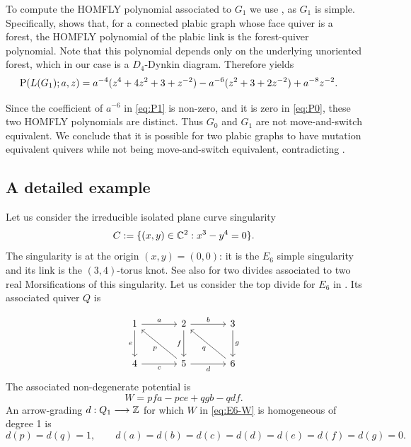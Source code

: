 \noindent To compute the HOMFLY polynomial associated to $G_1$ we use \cite{Schwartz}, as $G_1$ is simple. Specifically, \cite[Theorem~3.11]{Schwartz} shows that, for a connected plabic graph whose face quiver is a forest, the HOMFLY polynomial of the plabic link is the forest-quiver polynomial. Note that this polynomial depends only on the underlying unoriented forest, which in our case is a $D_4$-Dynkin diagram. Therefore \cite[Example~4.8]{Schwartz} yields
\begin{equation}\label{eq:P1}
\begin{aligned}
\operatorname{P}(L(G_1);a,z)
={}&a^{-4}(z^4+4z^2+3+z^{-2})-a^{-6}(z^2+3+2z^{-2})
+a^{-8}z^{-2}.
\end{aligned}
\end{equation}

\noindent Since the coefficient of $a^{-6}$ in \eqref{eq:P1} is non-zero, and it is zero in \eqref{eq:P0}, these two HOMFLY polynomials are distinct. Thus $G_0$ and $G_1$ are not move-and-switch equivalent. We conclude that it is possible for two plabic graphs to have mutation equivalent quivers while not being move-and-switch equivalent, contradicting \cite[Conjecture 6.17]{FPST}.

\subsection{A detailed example}\label{ssec:examples}

Let us consider the irreducible isolated plane curve singularity
\[
 C:=\{(x,y)\in\mathbb C^2:x^3-y^4=0\}.
\]
The singularity is at the origin $(x,y)=(0,0)$: it is the $E_6$ simple singularity and its link is the $(3,4)$-torus knot. See also \cite[Figure 4]{FPST} for two divides associated to two real Morsifications of this singularity. Let us consider the top divide for $E_6$ in \cite[Figure 4]{FPST}. Its associated quiver $Q$ is

\[
\begin{tikzcd}[column sep=large, row sep=large]
1
  \arrow[r, "a"]
  \arrow[d, "e"']
&
2
  \arrow[r, "b"]
  \arrow[d, "f"']
&
3
  \arrow[d, "g"]
\\
4
  \arrow[r, "c"']
&
5
  \arrow[r, "d"']
  \arrow[ul, "p"]
&
6
  \arrow[ul, "q"]
\end{tikzcd}
\]
\noindent The associated non-degenerate potential is
\begin{equation}\label{eq:E6-W}
 W=pfa-pce+qgb-qdf.
\end{equation}
An arrow-grading $d:Q_1\longrightarrow\mathbb Z$ for which $W$ in \eqref{eq:E6-W} is homogeneous of degree 1 is
\begin{equation}\label{eq:E6-d}
 d(p)=d(q)=1,
 \qquad
 d(a)=d(b)=d(c)=d(d)=d(e)=d(f)=d(g)=0.
\end{equation}

